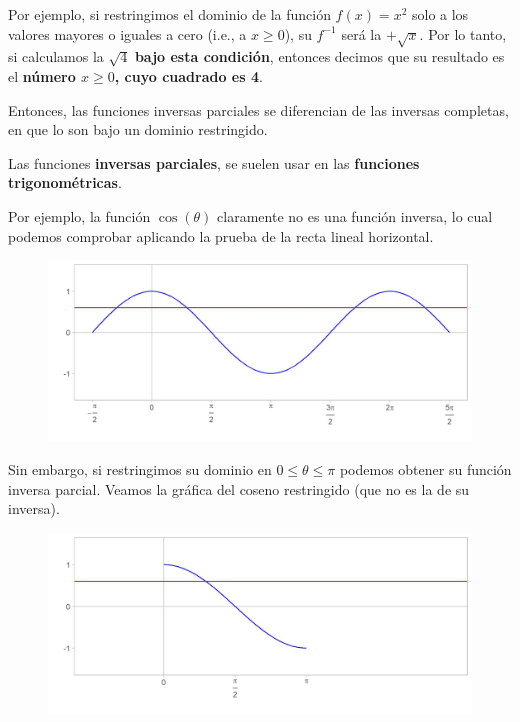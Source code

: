 \documentclass[12pt]{article}
\begin{document}
Por ejemplo, si restringimos el dominio de la función $f(x) = x^{2}$ solo a los valores mayores o iguales a cero (i.e., a $x \geq 0$), su $f^{-1}$ será la $+\sqrt{x}$. Por lo tanto, si calculamos la $\sqrt{4}$ \textbf{bajo esta condición}, entonces decimos que su resultado es el \textbf{número $x \geq 0$, cuyo cuadrado es 4}.

Entonces, las funciones inversas parciales se diferencian de las inversas completas, en que lo son bajo un dominio restringido.

Las funciones \textbf{inversas parciales}, se suelen usar en las \textbf{funciones trigonométricas}.

Por ejemplo, la función $\cos(\theta)$ claramente no es una función inversa, lo cual podemos comprobar aplicando la prueba de la recta lineal horizontal.

\begin{figure}[hbt!]
\centering
\includegraphics[scale=0.7]{img/cos_fun.jpg}
\end{figure}

Sin embargo, si restringimos su dominio en $0 \leq \theta \leq \pi$ podemos obtener su función inversa parcial. Veamos la gráfica del coseno restringido (que no es la de su inversa).

\newpage

\begin{figure}[hbt!]
\centering
\includegraphics[scale=0.7]{img/cos_fun_restr.jpg}
\end{figure}
\end{document}
